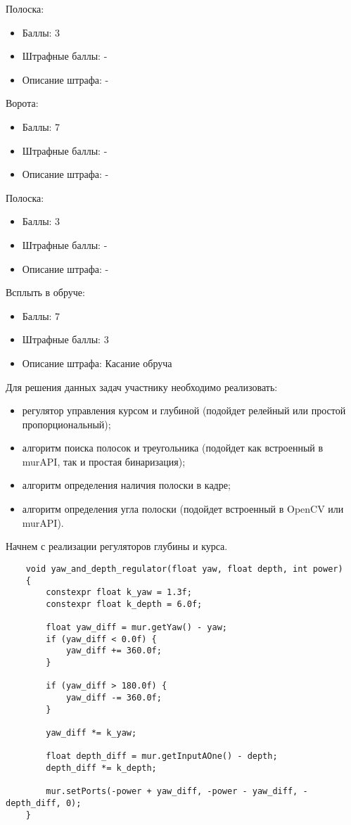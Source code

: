 \markSection

Полоска: 
\begin{itemize}
    \item Баллы: 3
    \item Штрафные баллы: -
    \item Описание штрафа: -
\end{itemize}

Ворота:
\begin{itemize}
    \item Баллы: 7
    \item Штрафные баллы: -
    \item Описание штрафа: -
\end{itemize}

Полоска: 
\begin{itemize}
    \item Баллы: 3
    \item Штрафные баллы: -
    \item Описание штрафа: -
\end{itemize}

Всплыть в обруче:
\begin{itemize}
    \item Баллы: 7
    \item Штрафные баллы: 3
    \item Описание штрафа: Касание обруча
\end{itemize}

\solutionSection

Для решения данных задач участнику необходимо реализовать:

\begin{itemize}
    \item регулятор управления курсом и глубиной (подойдет релейный или простой пропорциональный);
    \item алгоритм поиска полосок и треугольника (подойдет как встроенный в murAPI, так и простая бинаризация);
    \item алгоритм определения наличия полоски в кадре;
    \item алгоритм определения угла полоски (подойдет встроенный в OpenCV или murAPI).
\end{itemize}

Начнем с реализации регуляторов глубины и курса. 

\begin{verbatim}
    void yaw_and_depth_regulator(float yaw, float depth, int power)
    {
        constexpr float k_yaw = 1.3f;
        constexpr float k_depth = 6.0f;

        float yaw_diff = mur.getYaw() - yaw;
        if (yaw_diff < 0.0f) {
            yaw_diff += 360.0f;
        }

        if (yaw_diff > 180.0f) {
            yaw_diff -= 360.0f;
        }

        yaw_diff *= k_yaw;

        float depth_diff = mur.getInputAOne() - depth;
        depth_diff *= k_depth;

        mur.setPorts(-power + yaw_diff, -power - yaw_diff, -depth_diff, 0);
    }
\end{verbatim}

